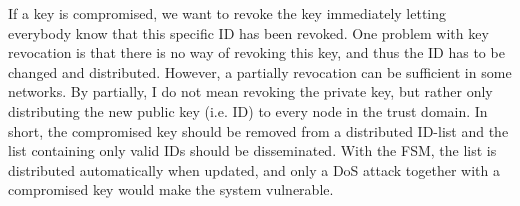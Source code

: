 If a key is compromised, we want to revoke the key immediately letting everybody know that this specific \gls{ID} has been revoked. 
One problem with key revocation is that there is no way of revoking this key, and thus the \gls{ID} has to be changed and distributed. 
However, a partially revocation can be sufficient in some networks. 
By partially, I do not mean revoking the private key, but rather only distributing the new public key (i.e. \gls{ID}) to every node in the trust domain.
In short, the compromised key should be removed from a distributed ID-list and the list containing only valid \gls{ID}s should be disseminated.
With the \gls{FSM}, the list is distributed automatically when updated, and only a \gls{DoS} attack together with a compromised key would make the system vulnerable. 

